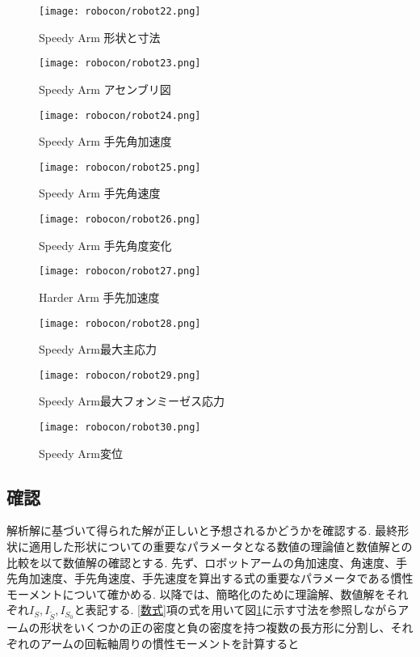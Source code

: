 \documentclass[10pt,b5paper,papersize,dvipdfmx]{jsbook}
\begin{document}
\begin{figure}[htbp]
  \centering
  \texttt{[image: robocon/robot22.png]}
  \caption{Speedy Arm 形状と寸法}
  \label{fig:Speedy Arm 形状と寸法}
\end{figure}
\begin{figure}[htbp]
  \centering
  \texttt{[image: robocon/robot23.png]}
  \caption{Speedy Arm アセンブリ図}
  \label{fig:Speedy Arm アセンブリ図}
\end{figure}
\begin{figure}[htbp]
  \centering
  \texttt{[image: robocon/robot24.png]}
  \caption{Speedy Arm 手先角加速度}
  \label{fig:Speedy Arm 手先角加速度}
\end{figure}
\begin{figure}[htbp]
  \centering
  \texttt{[image: robocon/robot25.png]}
  \caption{Speedy Arm 手先角速度}
  \label{fig:Speedy Arm 手先角速度}
\end{figure}
\begin{figure}[htbp]
  \centering
  \texttt{[image: robocon/robot26.png]}
  \caption{Speedy Arm 手先角度変化}
  \label{fig:Speedy Arm 手先角度変化}
\end{figure}
\begin{figure}[htbp]
  \centering
  \texttt{[image: robocon/robot27.png]}
  \caption{Harder Arm 手先加速度}
  \label{fig:Harder Arm 手先加速度2}
\end{figure}
\begin{figure}[htbp]
  \centering
  \texttt{[image: robocon/robot28.png]}
  \caption{Speedy Arm最大主応力}
  \label{fig:Speedy Arm最大主応力}
\end{figure}
\begin{figure}[htbp]
  \centering
  \texttt{[image: robocon/robot29.png]}
  \caption{Speedy Arm最大フォンミーゼス応力}
  \label{fig:Speedy Arm最大フォンミーゼス応力}
\end{figure}
\begin{figure}[htbp]
  \centering
  \texttt{[image: robocon/robot30.png]}
  \caption{Speedy Arm変位}
  \label{fig:Speedy Arm変位}
\end{figure}
\subsection{確認}
解析解に基づいて得られた解が正しいと予想されるかどうかを確認する. 最終形状に適用した形状についての重要なパラメータとなる数値の理論値と数値解との比較を以て数値解の確認とする. 先ず、ロボットアームの角加速度、角速度、手先角加速度、手先角速度、手先速度を算出する式の重要なパラメータである慣性モーメントについて確かめる. 以降では、簡略化のために理論解、数値解をそれぞれ$I_S$,\,$I_{\tilde{S}}$,\,$I_{S_0}$と表記する. \ref{数式}項の式を用いて図\ref{fig:Speedy Arm 形状と寸法}に示す寸法を参照しながらアームの形状をいくつかの正の密度と負の密度を持つ複数の長方形に分割し、それぞれのアームの回転軸周りの慣性モーメントを計算すると
\end{document}

